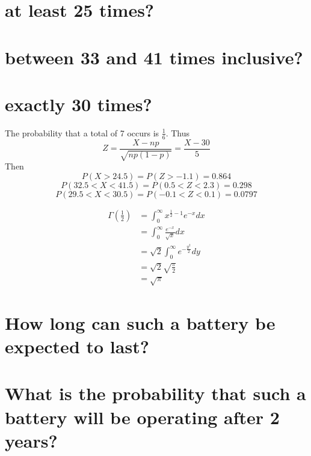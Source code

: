 \documentclass[answers]{exam}
\begin{document}
\begin{questions}
\begin{parts}
	\part{at least 25 times?}
	\part{between 33 and 41 times inclusive?}
	\part{exactly 30 times?}
\end{parts}

\begin{solution}
	The probability that a total of 7 occurs is $\frac{1}{6}$. Thus
	$$Z = \frac{X-np}{\sqrt{np(1-p)}} = \frac{X-30}{5}$$
	Then
	$$P(X>24.5) = P(Z>-1.1) = 0.864$$
	$$P(32.5<X<41.5) = P(0.5<Z<2.3) = 0.298$$
	$$P(29.5<X<30.5) = P(-0.1<Z<0.1) = 0.0797$$
\end{solution}


\begin{solution}
\begin{align*}
		\Gamma\left(\frac{1}{2}\right) &= \int_0^\infty x^{\frac{1}{2}-1}e^{-x}dx \\
					       &= \int_0^\infty \frac{e^{-x}}{\sqrt{x}}dx \\
					       &= \sqrt{2} \int_0^\infty e^{-\frac{y^2}{2}}dy \\
					       &= \sqrt{2} \sqrt{\frac{\pi}{2}} \\
					       &= \sqrt{\pi}
\end{align*}
\end{solution}


\begin{parts}
	\part{How long can such a battery be expected to last?}
	\part{What is the probability that such a battery will be operating after 2 years?}
\end{parts}


\end{questions}
\end{document}
